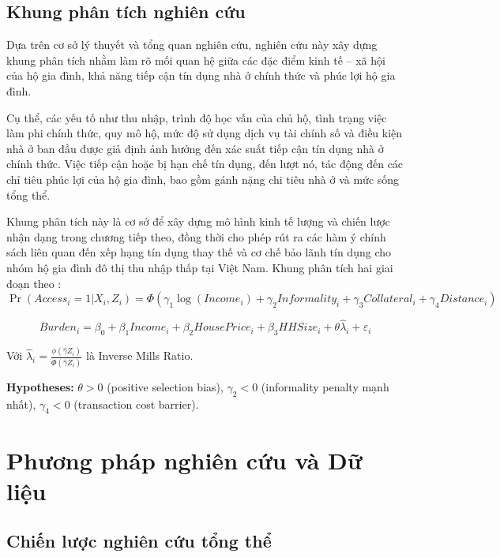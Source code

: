 \documentclass[12pt,a4paper]{report}
\begin{document}
	
	\section{Khung phân tích nghiên cứu}
	
	Dựa trên cơ sở lý thuyết và tổng quan nghiên cứu, nghiên cứu này xây dựng khung phân tích nhằm làm rõ mối quan hệ giữa các đặc điểm kinh tế – xã hội của hộ gia đình, khả năng tiếp cận tín dụng nhà ở chính thức và phúc lợi hộ gia đình.
	
	Cụ thể, các yếu tố như thu nhập, trình độ học vấn của chủ hộ, tình trạng việc làm phi chính thức, quy mô hộ, mức độ sử dụng dịch vụ tài chính số và điều kiện nhà ở ban đầu được giả định ảnh hưởng đến xác suất tiếp cận tín dụng nhà ở chính thức. Việc tiếp cận hoặc bị hạn chế tín dụng, đến lượt nó, tác động đến các chỉ tiêu phúc lợi của hộ gia đình, bao gồm gánh nặng chi tiêu nhà ở và mức sống tổng thể.
	
	Khung phân tích này là cơ sở để xây dựng mô hình kinh tế lượng và chiến lược nhận dạng trong chương tiếp theo, đồng thời cho phép rút ra các hàm ý chính sách liên quan đến xếp hạng tín dụng thay thế và cơ chế bảo lãnh tín dụng cho nhóm hộ gia đình đô thị thu nhập thấp tại Việt Nam.
	Khung phân tích hai giai đoạn theo \textcite{Heckman1979}:
	\begin{equation}
		\Pr(Access_i=1|X_i,Z_i) = \Phi(\gamma_1\log(Income_i) + \gamma_2Informality_i + \gamma_3Collateral_i + \gamma_4Distance_i)
		\label{eq:selection}
	\end{equation}
	
	\begin{equation}
		Burden_i = \beta_0 + \beta_1Income_i + \beta_2HousePrice_i + \beta_3HHSize_i + \theta\hat{\lambda}_i + \varepsilon_i
		\label{eq:outcome}
	\end{equation}
	
	Với $\hat{\lambda}_i = \frac{\phi(\hat{\gamma}Z_i)}{\Phi(\hat{\gamma}Z_i)}$ là Inverse Mills Ratio. 
	
	\textbf{Hypotheses:} $\theta > 0$ (positive selection bias), $\gamma_2 < 0$ (informality penalty mạnh nhất), $\gamma_4 < 0$ (transaction cost barrier).
		
	\chapter{Phương pháp nghiên cứu và Dữ liệu}
	
	\section{Chiến lược nghiên cứu tổng thể}
	
\end{document}
